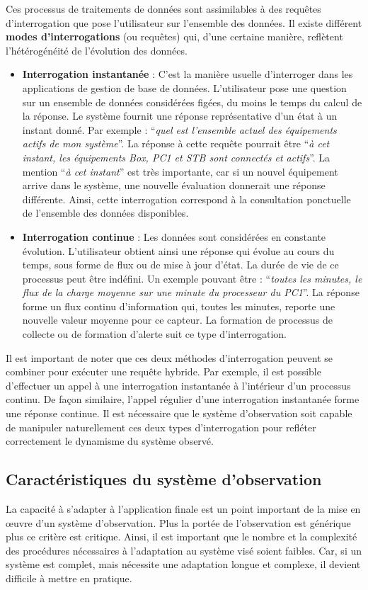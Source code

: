 Ces processus de traitements de données sont assimilables à des requêtes d'interrogation que pose l'utilisateur sur l'ensemble des données. Il existe différent \textbf{modes d'interrogations} (ou requêtes) qui, d'une certaine manière, reflètent l'hétérogénéité de l'évolution des données.
\begin{itemize}
    \item \textbf{Interrogation instantanée} : C'est la manière usuelle d'interroger dans les applications de gestion de base de données. L'utilisateur pose une question sur un ensemble de données considérées figées, du moins le temps du calcul de la réponse. Le système fournit une réponse représentative d'un état à un instant donné. Par exemple : \enquote{\it quel est l'ensemble actuel des équipements actifs de mon système}. La réponse à cette requête pourrait être \enquote{\it à cet instant, les équipements Box, PC1 et STB sont connectés et actifs}. La mention \enquote{\it à cet instant} est très importante, car si un nouvel équipement arrive dans le système, une nouvelle évaluation donnerait une réponse différente. Ainsi, cette interrogation correspond à la consultation ponctuelle de l'ensemble des données disponibles.
    \item \textbf{Interrogation continue} : Les données sont considérées en constante évolution. L'utilisateur obtient ainsi une réponse qui évolue au cours du temps, sous forme de flux ou de mise à jour d'état. La durée de vie de ce processus peut être indéfini. Un exemple pouvant être : \enquote{\it toutes les minutes, le flux de la charge moyenne sur une minute du processeur du PC1}. La réponse forme un flux continu d'information qui, toutes les minutes, reporte une nouvelle valeur moyenne pour ce capteur. La formation de processus de collecte ou de formation d'alerte suit ce type d'interrogation.
\end{itemize}

Il est important de noter que ces deux méthodes d'interrogation peuvent se combiner pour exécuter une requête hybride. Par exemple, il est possible d'effectuer un appel à une interrogation instantanée à l'intérieur d'un processus continu. De façon similaire, l'appel régulier d'une interrogation instantanée forme une réponse continue. Il est nécessaire que le système d'observation soit capable de manipuler naturellement ces deux types d'interrogation pour refléter correctement le dynamisme du système observé.

\subsection{Caractéristiques du système d'observation}\label{sec:intro:problematique:monitoring}
La capacité à s'adapter à l'application finale est un point important de la mise en œuvre d'un système d'observation. Plus la portée de l'observation est générique plus ce critère est critique. Ainsi, il est important que le nombre et la complexité des procédures nécessaires à l'adaptation au système visé soient faibles. Car, si un système est complet, mais nécessite une adaptation longue et complexe, il devient difficile à mettre en pratique.

